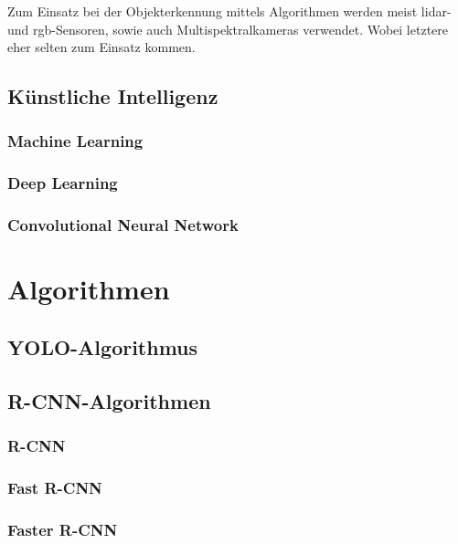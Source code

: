 \documentclass[12pt,
titlepage,
a4paper,
oneside,     %
openany,     %
listof=totoc,  %
numbers = noenddot, %
bibliography=totoc,    %
headsepline, %
]{scrbook} %
\begin{document}
Zum Einsatz bei der Objekterkennung mittels Algorithmen werden meist \ac{lidar}- und \ac{rgb}-Sensoren, sowie auch Multispektralkameras verwendet. Wobei letztere eher selten zum Einsatz kommen.

\section{Künstliche Intelligenz}
\label{sec_ki}

\subsection{Machine Learning}
\label{subsec_machine}

\subsection{Deep Learning}
\label{subsec_deep}

\subsection{Convolutional Neural Network}
\label{subsec_cnn}



\chapter{Algorithmen}
\label{cha:algorithmen}



\section{YOLO-Algorithmus}
\label{sec_yolo}

\section{R-CNN-Algorithmen}
\label{sec_rcnnalg}

\subsection{R-CNN}
\label{subsec_rcnn}

\subsection{Fast R-CNN}
\label{subsec_frcnn}

\subsection{Faster R-CNN}
\label{subsec_ffrcnn}
\end{document}
